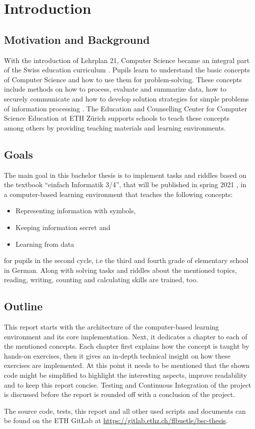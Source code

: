 \chapter{Introduction}

\section{Motivation and Background}

With the introduction of Lehrplan 21, Computer Science became an integral part of the Swiss education curriculum \cite{Lehrplan21}. Pupils learn to understand the basic concepts of Computer Science and how to use them for problem-solving. These concepts include methods on how to process, evaluate and summarize data, how to securely communicate and how to develop solution strategies for simple problems of information processing \cite{MedienUndInformatik}. The Education and Counselling Center for Computer Science Education at ETH Zürich \cite{ABZ} supports schools to teach these concepts among others by providing teaching materials and learning environments.

\section{Goals}

The main goal in this bachelor thesis is to implement tasks and riddles based on the textbook “einfach Informatik 3/4”, that will be published in spring 2021 \cite{EinfachInformatik}, in a computer-based learning environment that teaches the following concepts:

\begin{itemize}
    \item Representing information with symbols,
    \item Keeping information secret and
    \item Learning from data
\end{itemize}

for pupils in the second cycle, i.e the third and fourth grade of elementary school in German.
Along with solving tasks and riddles about the mentioned topics, reading, writing, counting and calculating skills are trained, too.

\section{Outline}

This report starts with the architecture of the computer-based learning environment and its core implementation. Next, it dedicates a chapter to each of the mentioned concepts. Each chapter first explains how the concept is taught by hands-on exercises, then it gives an in-depth technical insight on how these exercises are implemented. At this point it needs to be mentioned that the shown code might be simplified to highlight the interesting aspects, improve readability and to keep this report concise. Testing and Continuous Integration of the project is discussed before the report is rounded off with a conclusion of the project.

The source code, tests, this report and all other used scripts and documents can be found on the ETH GitLab at \url{https://gitlab.ethz.ch/flbuetle/bsc-thesis}.